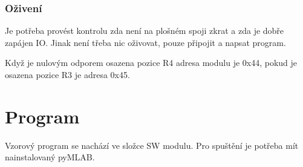 \documentclass[12pt,a4paper,final,titlepage,twoside]{article}
\begin{document}
\subsubsection{Oživení}
Je potřeba provést kontrolu zda není na plošném spoji zkrat a zda je dobře zapájen IO. Jinak není třeba nic oživovat, pouze připojit a napsat program.

Když je nulovým odporem osazena pozice R4 adresa modulu je 0x44, pokud je osazena pozice R3 je adresa 0x45.
\section{Program}
Vzorový program se nachází ve složce SW modulu. Pro spuštění je potřeba mít nainstalovaný  pyMLAB.
\end{document}
